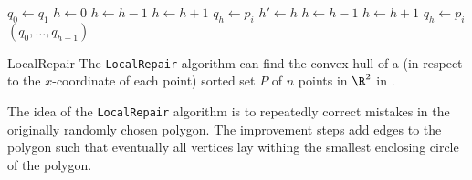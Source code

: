 \newpage
{}
\begin{algorithm}
    \caption{LocalRepair}
    \begin{algorithmic}[1]
            \State $q_0 \gets q_1$ 
            \State $h \gets 0$
             
                 
                    \State $h \gets h - 1$
                \EndWhile
                \State $h \gets h + 1$
                \State $q_h \gets p_i$ 
            \EndFor
            \State $h' \gets h$
             
                 
                    \State $h \gets h - 1$
                \EndWhile
                \State $h \gets h + 1$
                \State $q_h \gets p_i$
            \EndFor
            \State \Return $(q_0, \ldots, q_{h - 1})$ 
        \EndProcedure
    \end{algorithmic}
\end{algorithm}

\setcounter{all}{42}
\begin{theorem}[]{LocalRepair}
    The \verb|LocalRepair| algorithm can find the convex hull of a (in respect to the $x$-coordinate of each point) sorted set $P$ of $n$ points in $\R^2$ in .
\end{theorem}

The idea of the \verb|LocalRepair| algorithm is to repeatedly correct mistakes in the originally randomly chosen polygon. 
The improvement steps add edges to the polygon such that eventually all vertices lay withing the smallest enclosing circle of the polygon. 
